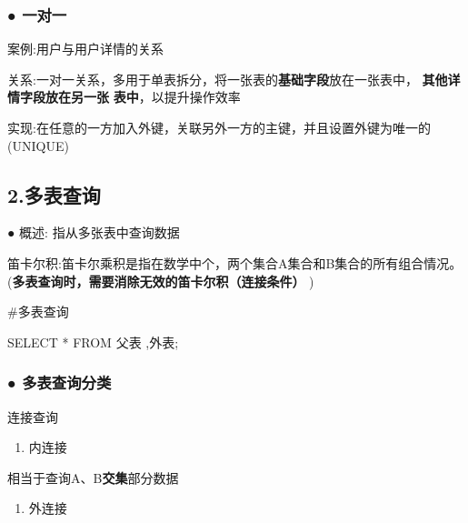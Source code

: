 \documentclass[
  letterpaper,
  DIV=11,
  numbers=noendperiod]{scrreprt}
\newenvironment{Shaded}{\begin{snugshade}}{\end{snugshade}}
\newcommand{\KeywordTok}[1]{\textcolor[rgb]{0.00,0.23,0.31}{#1}}
\newcommand{\NormalTok}[1]{\textcolor[rgb]{0.00,0.23,0.31}{#1}}
\newcommand{\OperatorTok}[1]{\textcolor[rgb]{0.37,0.37,0.37}{#1}}
\providecommand{\tightlist}{%
  \setlength{\itemsep}{0pt}\setlength{\parskip}{0pt}}\usepackage{longtable,booktabs,array}
\begin{document}
\hypertarget{ux4e00ux5bf9ux4e00}{%
\subsubsection{\texorpdfstring{\textbf{●
一对一}}{● 一对一}}\label{ux4e00ux5bf9ux4e00}}

案例:用户与用户详情的关系

关系:一对一关系，多用于单表拆分，将一张表的\textbf{基础字段}放在一张表中，
\textbf{其他详情字段放在另一张} \textbf{表中}，以提升操作效率

实现:在任意的一方加入外键，关联另外一方的主键，并且设置外键为唯一的(UNIQUE)

\hypertarget{ux591aux8868ux67e5ux8be2-1}{%
\subsection{2.多表查询}\label{ux591aux8868ux67e5ux8be2-1}}

\hspace{0pt} ● 概述: 指从多张表中查询数据

笛卡尔积:笛卡尔乘积是指在数学中个，两个集合A集合和B集合的所有组合情况。(\textbf{多表查询时，需要消除无效的笛卡尔积（连接条件）}
)

\begin{Shaded}
\begin{Highlighting}[]
\NormalTok{\#多表查询}

\KeywordTok{SELECT} \OperatorTok{*} \KeywordTok{FROM}\NormalTok{ 父表 ,外表;}
\end{Highlighting}
\end{Shaded}

\hypertarget{ux591aux8868ux67e5ux8be2ux5206ux7c7b}{%
\subsubsection{\texorpdfstring{\textbf{●
多表查询分类}}{● 多表查询分类}}\label{ux591aux8868ux67e5ux8be2ux5206ux7c7b}}

\hspace{0pt} 连接查询

\begin{enumerate}
\def\labelenumi{\arabic{enumi}.}
\tightlist
\item
  内连接
\end{enumerate}

\hspace{0pt} 相当于查询A、B\textbf{交集}部分数据

\begin{enumerate}
\def\labelenumi{\arabic{enumi}.}
\setcounter{enumi}{1}
\tightlist
\item
  外连接
\end{enumerate}
\end{document}
